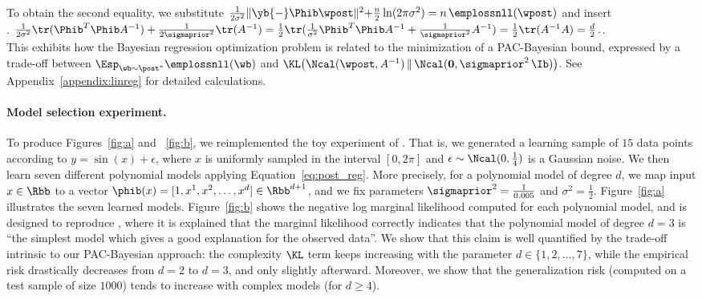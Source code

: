 \documentclass{article}
\theoremstyle{definition}
\theoremstyle{plain}
\begin{document}
%
To obtain the second equality, we substitute
$\tfrac1{2\sigma^2}\|\yb{-}\Phib\wpost\|^2{+}\tfrac n 2\ln(2\pi \sigma^2) = n\,\emplossnll(\wpost) $ and insert\\
%
\phantom.\hfill
	$\tfrac{1}{2\sigma^2}  \tr ( \Phib^T \Phib A^{-1}) + \tfrac1{2\sigmaprior^2} \tr(A^{-1}) 
= \tfrac12 \tr ( \tfrac{1}{\sigma^2} \Phib^T \Phib A^{-1} + \tfrac1{\sigmaprior^2} A^{-1}) 
=  \tfrac12 \tr ( A^{-1} A )
= \tfrac d2\,.$\hfill\phantom.\\
%
%
This exhibits how the Bayesian regression optimization problem is related to the minimization of a PAC-Bayesian bound, expressed by a trade-off between
$\Esp_{\wb\sim\post^*}\emplossnll(\wb)$
and
 $\KL\big(\Ncal(\wpost,A^{-1})\,\|\,\Ncal(\mathbf{0},\sigmaprior^2\,\Ib)\big)$.
 See Appendix~\ref{appendix:linreg} for detailed calculations.

\paragraph{Model selection experiment.}
To produce Figures~\ref{fig:a} and ~\ref{fig:b}, we reimplemented the toy experiment of \citet[Section~3.5.1]{bishop-2006}. 
That is, we generated a learning sample of $15$ data points according to $y=\sin(x)+\epsilon$, where $x$ is uniformly sampled in  the interval $[0,2\pi]$ and $\epsilon\sim\Ncal(0,\frac14)$ is a Gaussian noise. We then learn seven different polynomial models applying Equation~\eqref{eq:post_reg}. More precisely, for a polynomial model of degree $d$, we map input $x\in\Rbb$ to a vector $\phib(x) = [1,x^1,x^2,\ldots,x^d]\in\Rbb^{d+1}$, and we fix parameters $\sigmaprior^2=\frac1{0.005}$ and $\sigma^2=\frac12$.
Figure~\ref{fig:a} illustrates the seven learned models.
Figure~\ref{fig:b} shows the negative log marginal likelihood  computed for each polynomial model, and is designed to reproduce \citet[Figure 3.14]{bishop-2006}, where it is explained that the marginal likelihood correctly indicates that the polynomial model of degree $d=3$ is ``the simplest model which gives a good explanation for the observed data''. We show that this claim is well quantified by the trade-off intrinsic to our PAC-Bayesian approach: the complexity $\KL$ term keeps increasing with the parameter $d\in\{1,2,\ldots,7\}$, while the empirical risk drastically decreases from $d=2$ to $d=3$, and only slightly afterward.  Moreover, we show that the generalization risk (computed on a test sample of size $1000$) tends to increase with complex models (for $d\geq4$). 
\end{document}
